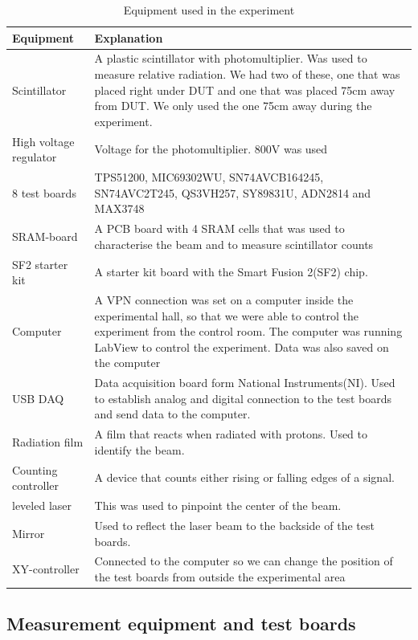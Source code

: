 \documentclass[12pt]{article}
\numberwithin{figure}{section}
\begin{document}
\newpage
\begin{table}[!htbp]
 \centering
\begin{tabular}{|l|p{10cm}|}\hline
Equipment & Explanation  \\ \hline \hline
Scintillator & A plastic scintillator with photomultiplier. Was used to measure relative radiation. We had two of these, one that was placed right under \acf{DUT} and one that was placed 75cm away from \ac{DUT}. We only used the one 75cm away during the experiment.   \\ \hline
High voltage regulator & Voltage for the photomultiplier. 800V was used  \\ \hline
8 test boards &  TPS51200, MIC69302WU, SN74AVCB164245, SN74AVC2T245, QS3VH257, SY89831U, ADN2814 and MAX3748 \\ \hline 
SRAM-board  & A PCB board with 4 \ac{SRAM} cells that was used to characterise the beam and to measure scintillator counts \\ \hline
SF2 starter kit & A starter kit board with the Smart Fusion 2(SF2) chip.  \\ \hline
Computer  & A VPN connection was set on a computer inside the experimental hall, so that we were able to control the experiment from the control room. The computer was running LabView to control the experiment. Data was also saved on the computer\\ \hline
USB DAQ  & Data acquisition board form National Instruments(NI). Used to establish analog and digital connection to the test boards and send data to the computer. \\ \hline
Radiation film  & A film that reacts when radiated with protons. Used to identify the beam. \\ \hline
Counting controller  & A device that counts either rising or falling edges of a signal. \\ \hline
leveled laser  & This was used to pinpoint the center of the beam.\\ \hline
Mirror & Used to reflect the laser beam to the backside of the test boards.\\ \hline
XY-controller  & Connected to the computer so we can change the position of the test boards from outside the experimental area\\ \hline
\end{tabular}
\caption{Equipment used in the experiment}
\label{equipment}
\end{table}

\subsection{Measurement equipment and test boards}
\end{document}
